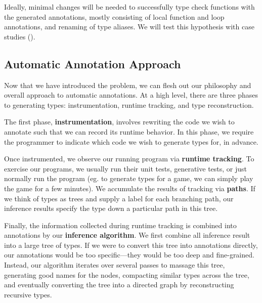 \documentclass[9pt]{extarticle}
\begin{document}
Ideally, minimal changes will be needed to successfully type check
functions with the generated annotations,
mostly consisting of local function and loop annotations,
and renaming of type aliases.
We will test this hypothesis with case studies
().

\subsection{Automatic Annotation Approach}

Now that we have introduced the problem,
we can flesh out our philosophy and overall approach to automatic
annotations.
At a high level, there are three phases to
generating types: instrumentation, runtime tracking, and type reconstruction.

The first phase, \textbf{instrumentation}, involves
rewriting the code we wish to annotate such
that we can record its runtime behavior.
In this phase, we require the programmer to
indicate which code we wish to generate types
for, in advance.

Once instrumented, we observe our running program
via \textbf{runtime tracking}. To exercise our programs,
we usually run their unit tests, generative tests,
or just normally run the program (eg. to generate types for
a game, we can simply play the game for a few minutes).
We accumulate the results of tracking via \textbf{paths}.
If we think of types as trees and supply a label
for each branching path, our inference results
specify the type down a particular path in this tree.

Finally, the information collected during runtime tracking
is combined into annotations by our \textbf{inference algorithm}.
We first combine all inference result into a large tree of
types. If we were to convert this tree into annotations directly,
our annotations would be too specific---they would be too
deep and fine-grained.
Instead, our algorithm iterates over several passes to massage
this tree, generating good names for the nodes, compacting similar
types across the tree, and
eventually converting the tree into a directed graph by reconstructing
recursive types.

%
%
%
\end{document}
